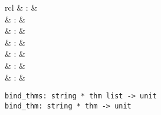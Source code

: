 \begin{isabellebody}
\begin{isamarkuptext}
\begin{description}
  \end{description}%
\end{isamarkuptext}%
\isamarkuptrue%
%
\isamarkuptrue%
%
\begin{isamarkuptext}%
\begin{matharray}{rcl}
    \hypertarget{command.use}{\hyperlink{command.use}{\mbox{}}} & : &  \\
    \hypertarget{command.ML}{\hyperlink{command.ML}{\mbox{}}} & : &  \\
    \hypertarget{command.ML-prf}{\hyperlink{command.ML-prf}{\mbox{}}} & : &  \\
    \hypertarget{command.ML-val}{\hyperlink{command.ML-val}{\mbox{}}} & : &  \\
    \hypertarget{command.ML-command}{\hyperlink{command.ML-command}{\mbox{}}} & : &  \\
    \hypertarget{command.setup}{\hyperlink{command.setup}{\mbox{}}} & : &  \\
    \hypertarget{command.local-setup}{\hyperlink{command.local-setup}{\mbox{}}} & : &  \\
  \end{matharray}

  \begin{mldecls}
    \verb|bind_thms: string * thm list -> unit| \\
    \verb|bind_thm: string * thm -> unit| \\
  \end{mldecls}


\end{isamarkuptext}
\end{isabellebody}
